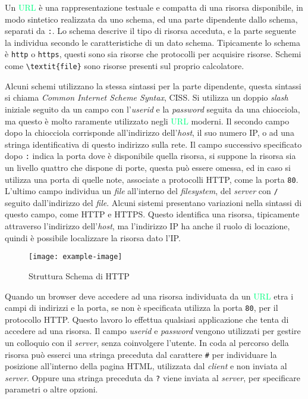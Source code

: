 \documentclass{article}
\numberwithin{equation}{subsection}
\begin{document}
Un \textcolor{SpringGreen}{URL} è una rappresentazione testuale e compatta di una risorsa disponibile, in modo sintetico realizzata da uno schema, ed una parte dipendente dallo schema, separati da \verb|:|. 
Lo schema descrive il tipo di risorsa acceduta, e la parte seguente la individua secondo le caratteristiche di un dato schema. Tipicamente lo schema è \verb|http| o \verb|https|, 
questi sono sia risorse che protocolli per acquisire risorse. Schemi come \verb|\textit{file}| sono risorse presenti sul proprio calcolatore. 

Alcuni schemi utilizzano la stessa sintassi per la parte dipendente, questa sintassi si chiama \textit{Common Internet Scheme Syntax}, CISS. Si utilizza un doppio \textit{slash} iniziale 
seguito da un campo con l'\textit{userid} e la \textit{password} seguita da una chiocciola, ma questo è molto raramente utilizzato negli \textcolor{SpringGreen}{URL} moderni. 
Il secondo campo dopo la chiocciola corrisponde all'indirizzo dell'\textit{host}, il suo numero \textcolor{Bittersweet}{IP}, o ad una stringa identificativa di questo indirizzo sulla rete. 
Il campo successivo specificato dopo \verb|:| indica la porta dove è disponibile quella risorsa, si suppone la risorsa sia un livello quattro che dispone di porte, 
questa può essere omessa, ed in caso si utilizza una porta di quelle note, associate a protocolli \textcolor{NavyBlue}{HTTP}, come la porta \texttt{80}. L'ultimo campo individua un \textit{file} 
all'interno del \textit{filesystem}, del \textit{server} con \verb|/| seguito dall'indirizzo del \textit{file}. Alcuni sistemi presentano variazioni nella sintassi di questo campo, come \textcolor{NavyBlue}{HTTP} e 
HTTPS. 
Questo identifica una risorsa, tipicamente attraverso l'indirizzo dell'\textit{host}, ma l'indirizzo \textcolor{Bittersweet}{IP} ha anche il ruolo di locazione, quindi è possibile localizzare la 
risorsa dato l'\textcolor{Bittersweet}{IP}. 

\begin{figure}[H]%
    \centering%
    \texttt{[image: example-image]}%
    \caption{Struttura Schema di \textcolor{NavyBlue}{HTTP}}%
\end{figure}

Quando un browser deve accedere ad una risorsa individuata da un \textcolor{SpringGreen}{URL} etra i campi di indirizzi e la porta, se non è specificata utilizza la porta \texttt{80}, per il protocollo 
\textcolor{NavyBlue}{HTTP}. Questo lavoro lo effettua qualsiasi applicazione che tenta di accedere ad una risorsa. 
Il campo \textit{userid} e \textit{password} vengono utilizzati per gestire un colloquio con il \textit{server}, senza coinvolgere l'utente. In coda al percorso della risorsa può esserci una stringa preceduta dal 
carattere \verb|#| per individuare la posizione all'interno della pagina \textcolor{Peach}{HTML}, utilizzata dal \textit{client} e non inviata al \textit{server}. 
Oppure una stringa preceduta da \verb|?| viene inviata al \textit{server}, per specificare parametri o altre opzioni. 
\end{document}
